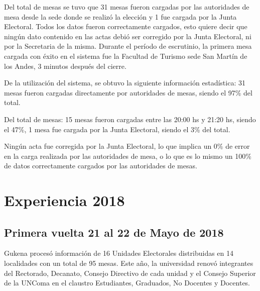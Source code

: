 Del total de mesas se tuvo que 31 mesas fueron cargadas por las autoridades de mesa desde la sede donde se realizó la elección y 1 fue cargada por la Junta Electoral. Todos los datos fueron correctamente cargados, esto quiere decir que ningún dato contenido en las actas debió ser corregido por la Junta Electoral, ni por la Secretaria de la misma.
Durante el período de escrutinio, la primera mesa cargada con éxito en el sistema fue la Facultad de Turismo sede San Martín de los Andes, 3 minutos después del cierre.

De la utilización del sistema, se obtuvo la siguiente información estadística:
31 mesas fueron cargadas directamente por autoridades de mesas, siendo el 97\% del total.

Del total de mesas:
15 mesas fueron cargadas entre las 20:00 hs y 21:20 hs, siendo el 47\%,
1 mesa fue cargada 	por la Junta Electoral, siendo el 3\% del total.

Ningún acta fue corregida por la Junta Electoral, lo que implica un 0\% de error en la carga realizada por las autoridades de mesa, o lo que es lo mismo un 100\% de datos correctamente cargados por las autoridades de mesas.

\section{Experiencia 2018}
\label{gukena2018}
\subsection{Primera vuelta 21 al 22 de Mayo de 2018}
Gukena procesó información de 16 Unidades Electorales distribuidas en 14 localidades con un total de 95 mesas. Este año, la universidad renovó integrantes del Rectorado, Decanato, Consejo Directivo de cada unidad y el Consejo Superior de la UNComa en el claustro Estudiantes, Graduados, No Docentes y Docentes.


